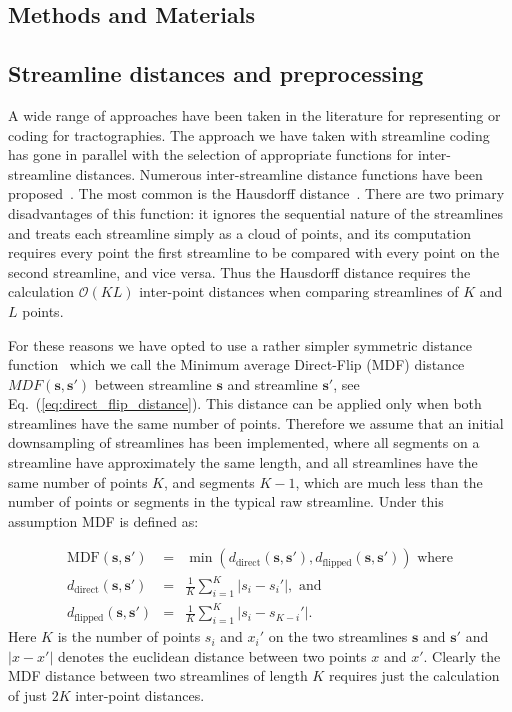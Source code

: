\documentclass{bioinfo}
\begin{document}
\begin{methods}

\section{Methods and Materials}

\subsection{\label{sub:track-distances}Streamline distances and preprocessing}

A wide range of approaches have been taken in the literature for
representing or coding for tractographies. The approach we have taken
with streamline coding has gone in parallel with the selection of
appropriate functions for inter-streamline distances.  Numerous
inter-streamline distance functions have been proposed~\citep{Ding2003,
  MaddahIPMI2007, zhang2005dti}. The most common is the Hausdorff
distance~\citep[and many other studies]{corouge2004towards}. There are
two primary disadvantages of this function: it ignores the sequential
nature of the streamlines and treats each streamline simply as a cloud
of points, and its computation requires every point the first streamline
to be compared with every point on the second streamline, and vice
versa. Thus the Hausdorff distance requires the calculation
$\mathcal{O}(KL)$ inter-point distances when comparing streamlines of
$K$ and $L$ points.

For these reasons we have opted to use a rather simpler symmetric
distance function~\citep{EGMB10, Visser2010} which we call the Minimum
average Direct-Flip (MDF) distance $MDF(\mathbf{s},\mathbf{s'})$ between
streamline $\mathbf{s}$ and streamline $\mathbf{s'}$, see
Eq.~(\ref{eq:direct_flip_distance}). This distance can be applied only
when both streamlines have the same number of points. Therefore we
assume that an initial downsampling of streamlines has been implemented,
where all segments on a streamline have approximately the same length,
and all streamlines have the same number of points $K$, and segments
$K-1$, which are much less than the number of points or segments in the
typical raw streamline.  Under this assumption MDF is defined as:

\begin{eqnarray}
\textrm{MDF}(\mathbf{s},\mathbf{s'}) & = & \min(d_{\textrm{direct}}(\mathbf{s},\mathbf{s'}),d_{\textrm{flipped}}(\mathbf{s},\mathbf{s'}))\,\,\textrm{where}\label{eq:direct_flip_distance}\\
d_{\textrm{direct}}(\mathbf{s},\mathbf{s'}) & = & \frac{1}{K}\sum_{i=1}^{K}|s_{i}-s_{i}'|,\,\,\textrm{and}\nonumber\\
d_{\textrm{flipped}}(\mathbf{s},\mathbf{s'}) & = & \frac{1}{K}\sum_{i=1}^{K}|s_{i}-s_{K-i}'|.\nonumber
\end{eqnarray}
\noindent
Here $K$ is the number of points $s_{i}$ and $x_{i}'$ on the two
streamlines $\mathbf{s}$ and $\mathbf{s'}$ and $|x-x'|$ denotes the
euclidean distance between two points $x$ and $x'$. Clearly the MDF
distance between two streamlines of length $K$ requires just the
calculation of just $2K$ inter-point distances.


\end{methods}
\end{document}

